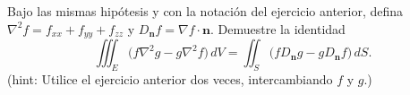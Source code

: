 ﻿Bajo las mismas hipótesis y con la notación del ejercicio anterior, defina $\nabla^2f=f_{xx}+f_{yy}+f_{zz}$ y $D_{\mathbf n}f=\nabla f\cdot\mathbf n$. Demuestre la identidad
\[
\iiint_E\bigl(f\nabla^2g-g\nabla^2f\bigr)\,dV
=\iint_S\bigl(fD_{\mathbf n}g-gD_{\mathbf n}f\bigr)\,dS.
\]
(hint: Utilice el ejercicio anterior dos veces, intercambiando $f$ y $g$.)
